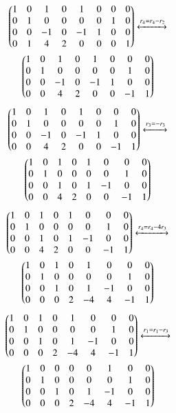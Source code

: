 \begin{multline}
\begin{pmatrix}1 & 0 & 1 & 0& 1 &0 &0 & 0 \\0 & 1 & 0 & 0& 0 &0 &1 &0 \\ 0 & 0 & -1 & 0& -1&1 &0&0  \\ 0 & 1 & 4 & 2& 0 & 0& 0 &1\end{pmatrix} \xleftrightarrow[]{r_4 = r_4-r_2} \\	\begin{pmatrix}1 & 0 & 1 & 0& 1 &0 &0 & 0 \\0 & 1 & 0 & 0& 0 &0 &1 &0 \\ 0 & 0 & -1 & 0& -1&1 &0&0  \\ 0 & 0 & 4 & 2& 0 & 0& -1 &1\end{pmatrix}
\end{multline}
\begin{multline}
\begin{pmatrix}1 & 0 & 1 & 0& 1 &0 &0 & 0 \\0 & 1 & 0 & 0& 0 &0 &1 &0 \\ 0 & 0 & -1 & 0& -1&1 &0&0  \\ 0 & 0 & 4 & 2& 0 & 0& -1 &1\end{pmatrix} \xleftrightarrow[]{r_3=-r_3} \\ \begin{pmatrix}1 & 0 & 1 & 0& 1 &0 &0 & 0 \\0 & 1 & 0 & 0& 0 &0 &1 &0 \\ 0 & 0 & 1 & 0& 1&-1 &0&0  \\ 0 & 0 & 4 & 2& 0 & 0& -1 &1\end{pmatrix}
\end{multline}
\begin{multline}
\begin{pmatrix}1 & 0 & 1 & 0& 1 &0 &0 & 0 \\0 & 1 & 0 & 0& 0 &0 &1 &0 \\ 0 & 0 & 1 & 0& 1&-1 &0&0  \\ 0 & 0 & 4 & 2& 0 & 0& -1 &1\end{pmatrix} \xleftrightarrow[]{r_4=r_4-4r_3} \\ \begin{pmatrix}1 & 0 & 1 & 0& 1 &0 &0 & 0 \\0 & 1 & 0 & 0& 0 &0 &1 &0 \\ 0 & 0 & 1 & 0& 1&-1 &0&0  \\ 0 & 0 & 0 & 2& -4 & 4& -1 &1\end{pmatrix}
\end{multline}
\begin{multline}
\begin{pmatrix}1 & 0 & 1 & 0& 1 &0 &0 & 0 \\0 & 1 & 0 & 0& 0 &0 &1 &0 \\ 0 & 0 & 1 & 0& 1&-1 &0&0  \\ 0 & 0 & 0 & 2& -4 & 4& -1 &1\end{pmatrix} \xleftrightarrow[]{r_1 = r_1-r_3} \\ \begin{pmatrix}1 & 0 & 0 & 0& 0 &1 &0 & 0 \\0 & 1 & 0 & 0& 0 &0 &1 &0 \\ 0 & 0 & 1 & 0& 1&-1 &0&0  \\ 0 & 0 & 0 & 2& -4 & 4& -1 &1\end{pmatrix}
\end{multline}
